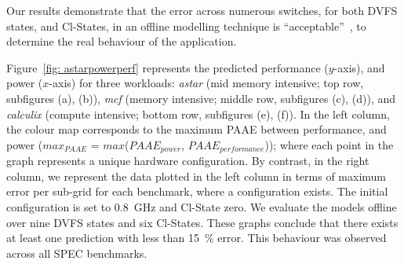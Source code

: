 Our results demonstrate that the error across numerous switches, for both DVFS states, and
Cl-States, in an offline modelling technique is ``acceptable''~\citep{Nishtala:2013:ETC:2555754.2555775, 
Su:2014:POP:2742155.2742200, Nishtala:ICPP, Nishtala:SBACPAD, Nishtala:IGSC, Bircher-PAAE}, to determine the real behaviour of the application.  

 Figure~\ref{fig: astarpowerperf} represents the predicted performance
($y$-axis), and power ($x$-axis) for three workloads: \emph{astar} (mid memory intensive;
top row, subfigures (a), (b)), \emph{mcf} (memory intensive; middle row, subfigures (c),
(d)), and \emph{calculix} (compute intensive; bottom row, subfigures (e), (f)). In the
left column, the colour map corresponds to the maximum PAAE between performance, and power
($max_{\mathit{PAAE}}$ = $max$($PAAE_{\mathit{power}}$, $PAAE_{\mathit{performance}}$));
where each point in the graph represents a unique hardware configuration. By contrast, in
the right column, we represent the data plotted in the left column in terms of maximum
error per sub-grid for each benchmark, where a configuration exists. The initial
configuration is set to \SI{0.8}{\giga\hertz} and Cl-State zero. We evaluate the models
offline over nine DVFS states and six Cl-States. These graphs conclude that there exists
at least one prediction with less than \SI{15}{\percent} error. This behaviour was
observed across all SPEC benchmarks.


